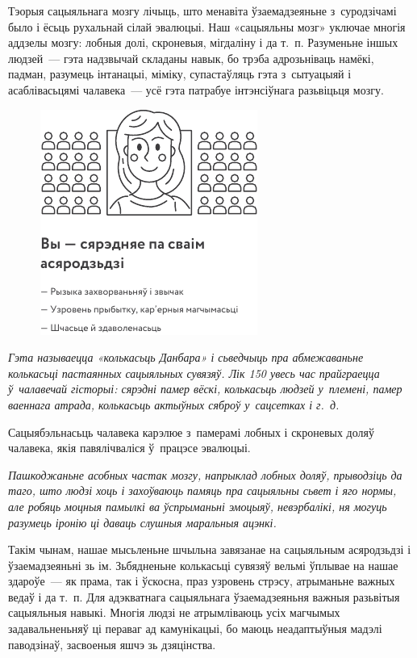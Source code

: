 Тэорыя сацыяльнага мозгу лічыць, што менавіта ўзаемадзеяньне з~суродзічамі было і ёсьць рухальнай сілай эвалюцыі. Наш «сацыяльны мозг» уключае многія аддзелы мозгу: лобныя долі, скроневыя, мігдаліну і да т.~п. Разуменьне іншых людзей~--- гэта надзвычай складаны навык, бо трэба адрозьніваць намёкі, падман, разумець інтанацыі, міміку, супастаўляць гэта з~сытуацыяй і асаблівасьцямі чалавека~--- усё гэта патрабуе інтэнсіўнага разьвіцьця мозгу.

\begin{figure}[htb!]
  \centering
  \includegraphics[scale=1.5]{willpower/ch10/2.pdf}
\end{figure}


\emph{Гэта называецца «колькасьць Данбара» і сьведчыць пра абмежаваньне колькасьці пастаянных сацыяльных сувязяў. Лік 150 увесь час прайграецца ў~чалавечай гісторыі: сярэдні памер вёскі, колькасьць людзей у~племені, памер ваеннага атрада, колькасьць актыўных сяброў у~сацсетках і г.~д.}

Сацыябэльнасьць чалавека карэлюе з~памерамі лобных і скроневых доляў чалавека, якія павялічваліся ў~працэсе эвалюцыі.

\emph{Пашкоджаньне асобных частак мозгу, напрыклад лобных доляў, прыводзіць да таго, што людзі хоць і захоўваюць памяць пра сацыяльны сьвет і яго нормы, але робяць моцныя памылкі ва ўспрыманьні эмоцыяў, невэрбалікі, ня могуць разумець іронію ці даваць слушныя маральныя ацэнкі.}

Такім чынам, нашае мысьленьне шчыльна завязанае на сацыяльным асяродзьдзі і ўзаемадзеяньні зь ім. Зьбядненьне колькасьці сувязяў вельмі ўплывае на нашае здароўе~--- як прама, так і ўскосна, праз узровень стрэсу, атрыманьне важных ведаў і да т.~п. Для адэкватнага сацыяльнага ўзаемадзеяньня важныя разьвітыя сацыяльныя навыкі. Многія людзі не атрымліваюць усіх магчымых задавальненьняў ці пераваг ад камунікацыі, бо маюць неадаптыўныя мадэлі паводзінаў, засвоеныя яшчэ зь дзяцінства. 

